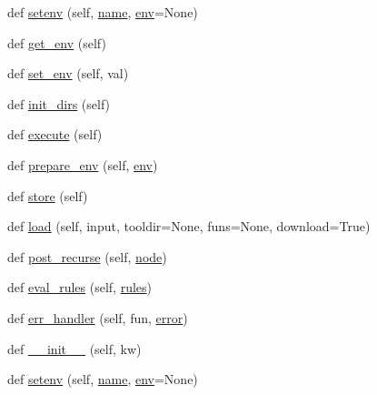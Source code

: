 \begin{DoxyCompactItemize}
def \hyperlink{classwaflib_1_1_configure_1_1_configuration_context_a2ed4960105cdf08c13cd178367ae1818}{setenv} (self, \hyperlink{lib_2expat_8h_a1b49b495b59f9e73205b69ad1a2965b0}{name}, \hyperlink{classwaflib_1_1_configure_1_1_configuration_context_a390267f6d3529fe07447ffb4925ca533}{env}=None)
\item 
def \hyperlink{classwaflib_1_1_configure_1_1_configuration_context_a5f2dfad34690147826b09413246140f7}{get\+\_\+env} (self)
\item 
def \hyperlink{classwaflib_1_1_configure_1_1_configuration_context_ad30b269279dd9c24e6d892bb3b2fc583}{set\+\_\+env} (self, val)
\item 
def \hyperlink{classwaflib_1_1_configure_1_1_configuration_context_a782925b68e221c10f8e08433329364c9}{init\+\_\+dirs} (self)
\item 
def \hyperlink{classwaflib_1_1_configure_1_1_configuration_context_a2dadcc441cc31bb49159c709bae0ec32}{execute} (self)
\item 
def \hyperlink{classwaflib_1_1_configure_1_1_configuration_context_a913063288a6135c3105acf180e7f0f0c}{prepare\+\_\+env} (self, \hyperlink{classwaflib_1_1_configure_1_1_configuration_context_a390267f6d3529fe07447ffb4925ca533}{env})
\item 
def \hyperlink{classwaflib_1_1_configure_1_1_configuration_context_aadaed27da973f44dde6eaa890026be35}{store} (self)
\item 
def \hyperlink{classwaflib_1_1_configure_1_1_configuration_context_ae13e6fac1db3060edb50337f97b7be3f}{load} (self, input, tooldir=None, funs=None, download=True)
\item 
def \hyperlink{classwaflib_1_1_configure_1_1_configuration_context_a9620736938604c56dc26964b06a24e2e}{post\+\_\+recurse} (self, \hyperlink{structnode}{node})
\item 
def \hyperlink{classwaflib_1_1_configure_1_1_configuration_context_af1b5fdd6d958f8b996dba916c44ec9fa}{eval\+\_\+rules} (self, \hyperlink{classwaflib_1_1_configure_1_1_configuration_context_a279ad5a7c2630c4416afc36cad85a2db}{rules})
\item 
def \hyperlink{classwaflib_1_1_configure_1_1_configuration_context_acc349b079382fdac3d626eb46bd54b7e}{err\+\_\+handler} (self, fun, \hyperlink{sndfile__save_8m_ada4b423bc19e6ff5c5b514e55f518a82}{error})
\item 
def \hyperlink{classwaflib_1_1_configure_1_1_configuration_context_a0f139855aa53920d6f30a05e10253ab0}{\+\_\+\+\_\+init\+\_\+\+\_\+} (self, kw)
\item 
def \hyperlink{classwaflib_1_1_configure_1_1_configuration_context_a2ed4960105cdf08c13cd178367ae1818}{setenv} (self, \hyperlink{lib_2expat_8h_a1b49b495b59f9e73205b69ad1a2965b0}{name}, \hyperlink{classwaflib_1_1_configure_1_1_configuration_context_a390267f6d3529fe07447ffb4925ca533}{env}=None)

\end{DoxyCompactItemize}
